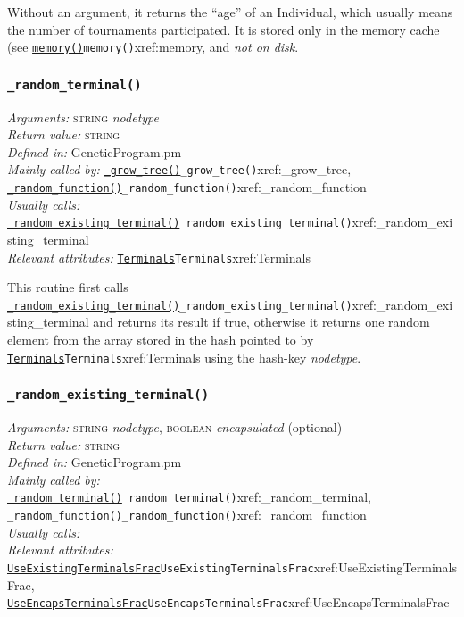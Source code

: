 \documentclass[a4paper]{article}
\begin{document}
Without an argument, it returns the ``age'' of an Individual,
which usually means the number of tournaments participated.
It is stored only in the memory cache (see \hyperref[no]{\texttt{memory()}}{\texttt{memory()}}{xref:memory},
and \textit{not on disk}.

\subsubsection{\texttt{\_random\_terminal()}}\label{xref:_random_terminal}
\begin{flushleft}
\textit{Arguments:} \textsc{string} \textit{nodetype}\\
\textit{Return value:} \textsc{string}\\
\textit{Defined in:} GeneticProgram.pm\\
\textit{Mainly called by:} \hyperref[no]{\texttt{\_grow\_tree()}}{\texttt{\_grow\_tree()}}{xref:_grow_tree}, \hyperref[no]{\texttt{\_random\_function()}}{\texttt{\_random\_function()}}{xref:_random_function}\\
\textit{Usually calls:} \hyperref[no]{\texttt{\_random\_existing\_terminal()}}{\texttt{\_random\_existing\_terminal()}}{xref:_random_existing_terminal}\\
\textit{Relevant attributes:} \hyperref[no]{\texttt{Terminals}}{\texttt{Terminals}}{xref:Terminals}
\end{flushleft}

This routine first calls \hyperref[no]{\texttt{\_random\_existing\_terminal()}}{\texttt{\_random\_existing\_terminal()}}{xref:_random_existing_terminal} and
returns its result if true, otherwise it returns one random element
from the array stored in the hash pointed to by \hyperref[no]{\texttt{Terminals}}{\texttt{Terminals}}{xref:Terminals}
using the hash-key \textit{nodetype}.

\subsubsection{\texttt{\_random\_existing\_terminal()}}\label{xref:_random_existing_terminal}
\begin{flushleft}
\textit{Arguments:} \textsc{string} \textit{nodetype}, \textsc{boolean} \textit{encapsulated} (optional)\\
\textit{Return value:} \textsc{string}\\
\textit{Defined in:} GeneticProgram.pm\\
\textit{Mainly called by:} \hyperref[no]{\texttt{\_random\_terminal()}}{\texttt{\_random\_terminal()}}{xref:_random_terminal}, \hyperref[no]{\texttt{\_random\_function()}}{\texttt{\_random\_function()}}{xref:_random_function}\\
\textit{Usually calls:} \\
\textit{Relevant attributes:} \hyperref[no]{\texttt{UseExistingTerminalsFrac}}{\texttt{UseExistingTerminalsFrac}}{xref:UseExistingTerminalsFrac}, \hyperref[no]{\texttt{UseEncapsTerminalsFrac}}{\texttt{UseEncapsTerminalsFrac}}{xref:UseEncapsTerminalsFrac}
\end{flushleft}
\end{document}
